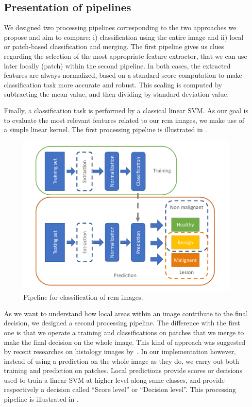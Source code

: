 \subsection{Presentation of pipelines}
\label{pipelines}
We designed two processing pipelines corresponding to the two approaches we propose and aim to compare: i) classification using the entire image and ii) local or patch-based classification and merging. The first pipeline gives us clues regarding the selection of the most appropriate feature extractor, that we can use later locally (patch) within the second pipeline. In both cases, the extracted features are always normalized, based on a standard score computation to make classification task more accurate and robust. This scaling is computed by subtracting the mean value, and then dividing by standard deviation value.\par
Finally, a classification task is performed by a classical linear SVM. As our goal is to evaluate the most relevant features related to our \ac{rcm} images, we make use of a simple linear kernel. The first processing pipeline is illustrated in .\par
\begin{figure}[H]
    \begin{center}
        \includegraphics[width=0.65\linewidth]{content/figures/Simple.pdf}
        \caption{Pipeline for classification of \ac{rcm} images.}
        \label{simple}
    \end{center} 
\end{figure}
As we want to understand how local areas within an image contribute to the final decision, we designed a second processing pipeline. The difference with the first one is that we operate a training and classifications on patches that we merge to make the final decision on the whole image. This kind of approach was suggested by recent researches on histology images by~\cite{Xu2015,Hou2016}. In our implementation however, instead of using a prediction on the whole image as they do, we carry out both training and prediction on patches. Local predictions provide scores or decisions used to train a linear SVM at higher level along same classes, and provide respectively a decision called “Score level” or “Decision level”. This processing pipeline is illustrated in .\par
